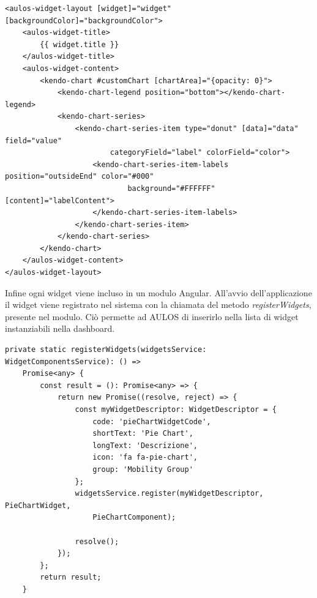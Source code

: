 \begin{lstlisting}[caption={File pie-chart.component.html}, style=javaScriptCode]
<aulos-widget-layout [widget]="widget" [backgroundColor]="backgroundColor">
    <aulos-widget-title>
        {{ widget.title }}
    </aulos-widget-title>
    <aulos-widget-content>
        <kendo-chart #customChart [chartArea]="{opacity: 0}">
            <kendo-chart-legend position="bottom"></kendo-chart-legend>
            <kendo-chart-series>
                <kendo-chart-series-item type="donut" [data]="data" field="value" 
                        categoryField="label" colorField="color">
                    <kendo-chart-series-item-labels position="outsideEnd" color="#000" 
                            background="#FFFFFF" [content]="labelContent">
                    </kendo-chart-series-item-labels>
                </kendo-chart-series-item>
            </kendo-chart-series>
        </kendo-chart>
    </aulos-widget-content>
</aulos-widget-layout>
\end{lstlisting}
Infine ogni widget viene incluso in un modulo Angular. All'avvio dell'applicazione il widget viene registrato nel sistema con la chiamata del metodo \textit{registerWidgets}, presente nel modulo. Ciò permette ad AULOS di inserirlo nella lista di widget instanziabili nella dashboard.

\begin{lstlisting}[caption={Modulo relativo al widget Piechart, metodo di registrazione del widget nel sistema}, style=javaScriptCode]
private static registerWidgets(widgetsService: WidgetComponentsService): () => 
    Promise<any> {
        const result = (): Promise<any> => {
            return new Promise((resolve, reject) => {
                const myWidgetDescriptor: WidgetDescriptor = {
                    code: 'pieChartWidgetCode',
                    shortText: 'Pie Chart',
                    longText: 'Descrizione',
                    icon: 'fa fa-pie-chart',
                    group: 'Mobility Group'
                };
                widgetsService.register(myWidgetDescriptor, PieChartWidget, 
                    PieChartComponent);

                resolve();
            });
        };
        return result;
    }
\end{lstlisting}

